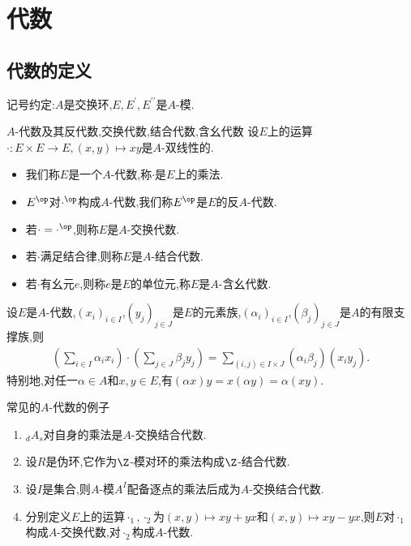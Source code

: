 \chapter{代数}

\section{代数的定义}

记号约定:$A$是交换环,$E,E^{\prime},E^{\prime\prime}$是$A$-模.

\begin{definition}{$A$-代数及其反代数,交换代数,结合代数,含幺代数}{}
	设$E$上的运算$\cdot:E\times E\to E,\left(x,y\right)\mapsto xy$是$A$-双线性的.
	\begin{itemize}
		\item 我们称$E$是一个$A$-代数,称$\cdot$是$E$上的乘法.
		\item $E^{\op}$对$\cdot^{\op}$构成$A$-代数,我们称$E^{\op}$是$E$的反$A$-代数.
		\item 若$\cdot=\cdot^{\op}$,则称$E$是$A$-交换代数.
		\item 若$\cdot$满足结合律,则称$E$是$A$-结合代数.
		\item 若$\cdot$有幺元$e$,则称$e$是$E$的单位元,称$E$是$A$-含幺代数.
	\end{itemize}
\end{definition}

\begin{proposition}{}{}
	设$E$是$A$-代数,$\left(x_{i}\right)_{i\in I}$,$\left(y_{j}\right)_{j\in J}$是$E$的元素族,$\left(\alpha_{i}\right)_{i\in I}$,$\left(\beta_{j}\right)_{j\in J}$是$A$的有限支撑族,则
	\begin{align*}
		\left(\sum_{i\in I}\alpha_{i}x_{i}\right)\cdot\left(\sum_{j\in J}\beta_{j}y_{j}\right)=\sum_{\left(i,j\right)\in I\times J}\left(\alpha_{i}\beta_{j}\right)\left(x_{i}y_{j}\right).
	\end{align*}
	特别地,对任一$\alpha\in A$和$x,y\in E$,有$\left(\alpha x\right)y=x\left(\alpha y\right)=\alpha\left(xy\right)$.
\end{proposition}

\begin{example}{常见的$A$-代数的例子}{}
	\begin{enumerate}
		\item $_{d}A_{s}$对自身的乘法是$A$-交换结合代数.
		\item 设$R$是伪环,它作为$\Z$-模对环的乘法构成$\Z$-结合代数.
		\item 设$I$是集合,则$A$-模$A^{I}$配备逐点的乘法后成为$A$-交换结合代数.
		\item 分别定义$E$上的运算$\cdot_{1},\cdot_{2}$为$\left(x,y\right)\mapsto xy+yx$和$\left(x,y\right)\mapsto xy-yx$,则$E$对$\cdot_{1}$构成$A$-交换代数,对$\cdot_{2}$构成$A$-代数.
	\end{enumerate}
\end{example}

